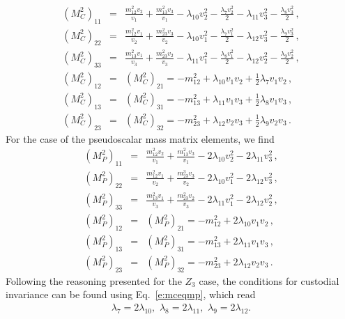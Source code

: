 \documentclass[11pt]{article}
\begin{document}
	\begin{subequations}
		\begin{eqnarray}
		\label{e:Mcsqz2}
		(M_C^2)_{11} &=&	\frac{m_{12}^2 v_2}{v_1} + \frac{m_{13}^2 v_3}{v_1} -\lambda_{10}v_2^2 -\frac{ \lambda_7 v_2^2}{2} - \lambda_{11} v_3^2 - \frac{\lambda_8 v_3^2}{2} \,,\\
		(M_C^2)_{22} &=&  \frac{m_{12}^2 v_1}{v_2} +\frac{m_{23}^2 v_3}{v_2} - \lambda_{10} v_1^2 -\frac{\lambda_7 v_1^2}{2}   -\lambda_{12} v_3^2 - \frac{\lambda_9 v_3^2}{2}\,,\\
		(M_C^2)_{33} &=& \frac{m_{13}^2 v_1}{v_3} + \frac{m_{23}^2 v_2}{v_3} - \lambda_{11} v_1^2 - \frac{\lambda_8 v_1^2}{2}  - \lambda_{12} v_2^2 - \frac{\lambda_9 v_2^2}{2} \,,\\
		(M_C^2)_{12} &=& (M_C^2)_{21} =  -m_{12}^2 + \lambda_{10} v_1v_2 + \frac{1}{2}\lambda_7 v_1v_2 \,,\\
		(M_C^2)_{13} &=& (M_C^2)_{31} =  -m_{13}^2 + \lambda_{11} v_1v_3 + \frac{1}{2}\lambda_8 v_1v_3\,,\\
		(M_C^2)_{23} &=& (M_C^2)_{32} =  -m_{23}^2 + \lambda_{12} v_2v_3 + \frac{1}{2}\lambda_9v_2v_3\,.
		\end{eqnarray}
	\end{subequations}
%
For the case of the pseudoscalar mass matrix elements, we find
%
\begin{subequations}
		\begin{eqnarray}
		\label{e:Mpsqz2}
		(M_P^2)_{11} &=& \frac{m_{12}^2 v_2}{v_1} +\frac{m_{13}^2 v_3}{v_1} -2 \lambda_{10}v_2^2 -2 \lambda_{11}v_3^2 \,,	\\
		(M_P^2)_{22} &=& \frac{m_{12}^2 v_1}{v_2} + \frac{m_{23}^3 v_3}{v_2} -2 \lambda_{10} v_1^2  -2 \lambda_{12} v_3^2 \,,\\
		(M_P^2)_{33} &=& \frac{m_{13}^2 v_1}{v_3} + \frac{m_{23}^2 v_2}{v_3} -2 \lambda_{11} v_1^2 -2 \lambda_{12} v_2^2 \,,\\
		(M_P^2)_{12} &=& (M_P^2)_{21}   = -m_{12}^2 + 2 \lambda_{10} v_1 v_2   \,,\\
		(M_P^2)_{13} &=& (M_P^2)_{31}   = -m_{13}^2 + 2 \lambda_{11} v_1 v_3 \,,\\
		(M_P^2)_{23} &=& (M_P^2)_{32}  =  -m_{23}^2 + 2 \lambda_{12} v_2 v_3\,.
		\end{eqnarray}
	\end{subequations}
%
Following the reasoning presented for the $Z_3$ case, the conditions for custodial invariance can be found using Eq.~\eqref{e:mceqmp}, which read
%
\begin{eqnarray}
	\label{e:z2z2_conditions}
	\lambda_7=2\lambda_{10}, \,\, \lambda_8=2\lambda_{11}, \, \, \lambda_9=2\lambda_{12}.
\end{eqnarray}
%
\end{document}

